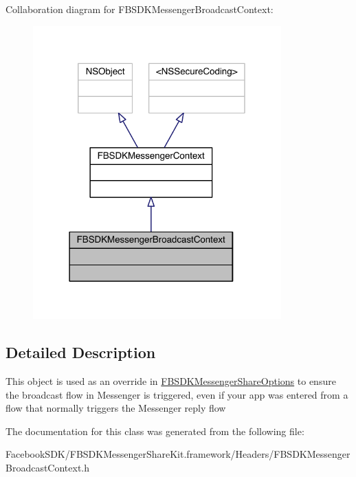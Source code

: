 Collaboration diagram for F\-B\-S\-D\-K\-Messenger\-Broadcast\-Context\-:
\nopagebreak
\begin{figure}[H]
\begin{center}
\leavevmode
\includegraphics[width=271pt]{interface_f_b_s_d_k_messenger_broadcast_context__coll__graph}
\end{center}
\end{figure}


\subsection{Detailed Description}
This object is used as an override in \hyperlink{interface_f_b_s_d_k_messenger_share_options}{F\-B\-S\-D\-K\-Messenger\-Share\-Options} to ensure the broadcast flow in Messenger is triggered, even if your app was entered from a flow that normally triggers the Messenger reply flow 

The documentation for this class was generated from the following file\-:\begin{DoxyCompactItemize}
\item 
Facebook\-S\-D\-K/\-F\-B\-S\-D\-K\-Messenger\-Share\-Kit.\-framework/\-Headers/F\-B\-S\-D\-K\-Messenger\-Broadcast\-Context.\-h\end{DoxyCompactItemize}
